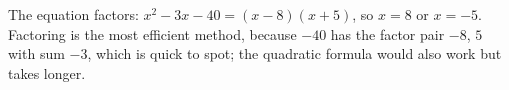 The equation factors: $x^2-3x-40=(x-8)(x+5)$, so $x=\boxed{8}$ or $x=\boxed{-5}$. Factoring is the most efficient method, because $-40$ has the factor pair $-8$, $5$ with sum $-3$, which is quick to spot; the quadratic formula would also work but takes longer.
